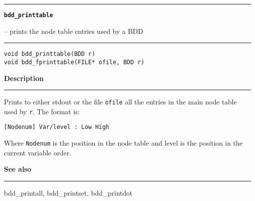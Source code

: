 \begin{minipage}{\textwidth}

\noindent\begin{minipage}{\textwidth}
\rule{\textwidth}{0.5mm}
{\tt\bf bdd\_printtable }
\--- prints the node table entries used by a BDD  \hspace{\fill}
\\\rule[1.5ex]{\textwidth}{0.5mm}
\end{minipage}

\noindent\begin{verbatim}
void bdd_printtable(BDD r)
void bdd_fprinttable(FILE* ofile, BDD r) 
\end{verbatim}

\vspace{\parsep}\noindent
{\bf Description}\\\rule[1.5ex]{\textwidth}{0.2mm}\vspace{-1.5ex}\setlength{\parindent}{1em}
Prints to either stdout or the file {\tt ofile} all the entries
           in the main node table used by {\tt r}. The format is:
	   \begin{Ill}
  	     {\tt [Nodenum] Var/level :  Low High}
	   \end{Ill}
	   Where {\tt Nodenum} is the position in the node table and level
	   is the position in the current variable order. 

\vspace{\parsep}\vspace{\baselineskip}\noindent
{\bf See also}\\\rule[1.5ex]{\textwidth}{0.2mm}\vspace{-1.5ex}
bdd\_printall, bdd\_printset, bdd\_printdot 
\end{minipage}
\vspace{8ex}
